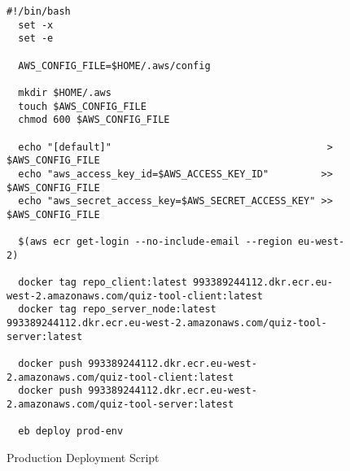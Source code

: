 \begin{figure}[h!]
  \begin{lstlisting}[basicstyle=\small, breaklines=true]
  #!/bin/bash
  set -x
  set -e

  AWS_CONFIG_FILE=$HOME/.aws/config

  mkdir $HOME/.aws
  touch $AWS_CONFIG_FILE
  chmod 600 $AWS_CONFIG_FILE

  echo "[default]"                                     > $AWS_CONFIG_FILE
  echo "aws_access_key_id=$AWS_ACCESS_KEY_ID"         >> $AWS_CONFIG_FILE
  echo "aws_secret_access_key=$AWS_SECRET_ACCESS_KEY" >> $AWS_CONFIG_FILE

  $(aws ecr get-login --no-include-email --region eu-west-2)

  docker tag repo_client:latest 993389244112.dkr.ecr.eu-west-2.amazonaws.com/quiz-tool-client:latest
  docker tag repo_server_node:latest 993389244112.dkr.ecr.eu-west-2.amazonaws.com/quiz-tool-server:latest

  docker push 993389244112.dkr.ecr.eu-west-2.amazonaws.com/quiz-tool-client:latest
  docker push 993389244112.dkr.ecr.eu-west-2.amazonaws.com/quiz-tool-server:latest

  eb deploy prod-env
  \end{lstlisting}
  \caption{Production Deployment Script}
  \label{sample:deploy}
\end{figure}

\newpage
